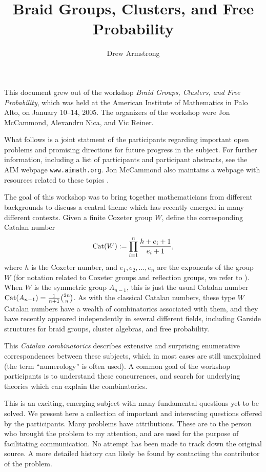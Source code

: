 \documentclass[12pt,letterpaper, reqno]{amsart}
\newcommand{\Cat}{{\rm Cat}}
\begin{document}
\title{Braid Groups, Clusters, and Free Probability}
\author{Drew Armstrong}

\maketitle

This document grew out of the workshop {\em Braid Groups, Clusters,
and Free Probability}, which was held at the American Institute of
Mathematics in Palo Alto, on January 10--14, 2005. The organizers of
the workshop were Jon McCammond, Alexandru Nica, and Vic Reiner.

What follows is a joint statment of the participants regarding important
open problems and promising directions for future progress in the
subject. For further information, including a list of participants and
participant abstracts, see the AIM webpage \texttt{www.aimath.org}. Jon
McCammond also maintains a webpage with resources related to these
topics \cite{mccammond:webpage}.

The goal of this workshop was to bring together mathematicians from
different backgrounds to discuss a central theme which has recently
emerged in many different contexts.  Given a finite Coxeter group $W$,
define the corresponding {\sf Catalan number}
\begin{equation*}
\Cat(W):=\prod_{i=1}^n \frac{h+e_i+1}{e_i+1},
\end{equation*}
where $h$ is the Coxeter number, and $e_1,e_2,\ldots,e_n$ are the
exponents of the group $W$ (for notation related to Coxeter groups
and reflection groups, we refer to \cite{humphries}). When $W$ is
the symmetric group $A_{n-1}$, this is just the usual Catalan number
$\Cat(A_{n-1})=\frac{1}{n+1}\binom{2n}{n}$. As with the classical Catalan
numbers, these type $W$ Catalan numbers have a wealth of combinatorics
associated with them, and they have recently appeared independently in
several different fields, including Garside structures for braid groups,
cluster algebras, and free probability.

This {\em Catalan combinatorics} describes extensive and surprising
enumerative correspondences between these subjects, which in most cases
are still unexplained (the term ``numerology'' is often used). A common
goal of the workshop participants is to understand these concurrences,
and search for underlying theories which can explain the combinatorics.

This is an exciting, emerging subject with many fundamental questions
yet to be solved. We present here a collection of important and
interesting questions offered by the participants. Many problems have
attributions. These are to the person who brought the problem to my
attention, and are used for the purpose of facilitating communication. No
attempt has been made to track down the original source. A more detailed
history can likely be found by contacting the contributor of the problem.
\end{document}
